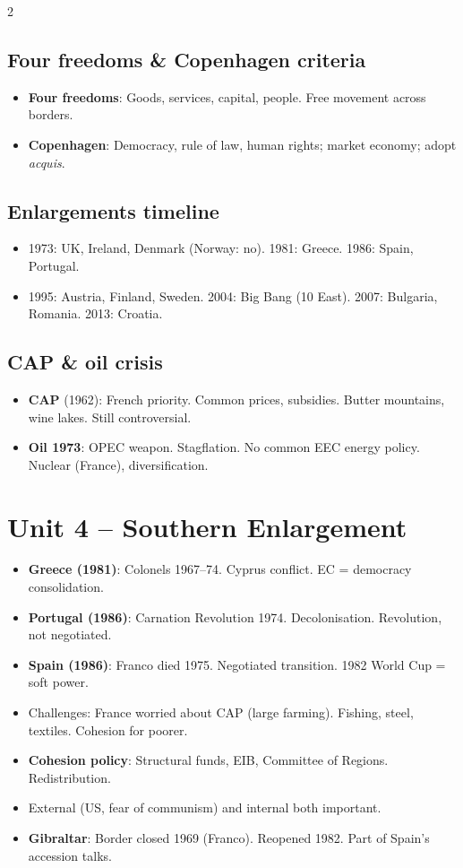\documentclass[8pt,landscape,a4paper]{article}
\newcommand{\handnote}[1]{\marginnote{\raggedright\footnotesize\color{noteblue}#1\vspace{0.4em}}}
\begin{document}
\begin{multicols}{2}
\subsection*{Four freedoms \& Copenhagen criteria}
\begin{itemize}[leftmargin=*,nosep]
\item \textbf{Four freedoms}: Goods, services, capital, people. Free movement across borders.
\item \textbf{Copenhagen}: Democracy, rule of law, human rights; market economy; adopt \textit{acquis}.
\end{itemize}

\subsection*{Enlargements timeline}
\begin{itemize}[leftmargin=*,nosep]
\item 1973: UK, Ireland, Denmark (Norway: no). 1981: Greece. 1986: Spain, Portugal.
\item 1995: Austria, Finland, Sweden. 2004: Big Bang (10 East). 2007: Bulgaria, Romania. 2013: Croatia.
\end{itemize}

\subsection*{CAP \& oil crisis}
\begin{itemize}[leftmargin=*,nosep]
\item \textbf{CAP} (1962): French priority. Common prices, subsidies. Butter mountains, wine lakes. Still controversial.
\item \textbf{Oil 1973}: OPEC weapon. Stagflation. No common EEC energy policy. Nuclear (France), diversification.
\end{itemize}

\section*{Unit 4 -- Southern Enlargement}\handnote{Democracy consolidation.}
\begin{itemize}[leftmargin=*,nosep]
\item \textbf{Greece (1981)}: Colonels 1967--74. Cyprus conflict. EC = democracy consolidation.
\item \textbf{Portugal (1986)}: Carnation Revolution 1974. Decolonisation. Revolution, not negotiated.
\item \textbf{Spain (1986)}: Franco died 1975. Negotiated transition. 1982 World Cup = soft power.
\item Challenges: France worried about CAP (large farming). Fishing, steel, textiles. Cohesion for poorer.
\item \textbf{Cohesion policy}: Structural funds, EIB, Committee of Regions. Redistribution.
\item External (US, fear of communism) and internal both important.
\item \textbf{Gibraltar}: Border closed 1969 (Franco). Reopened 1982. Part of Spain's accession talks.
\end{itemize}


\end{multicols}
\end{document}
